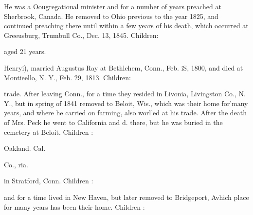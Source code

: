 \documentclass[oneside]{book}
\begin{document}
He was a Oougregatioual minister and for a number of years 
preached at Sherbrook, Canada. He removed to Ohio previous 
to the year 1825, and continued preaching there until within a 
few years of his death, which occurred at Greeusburg, Trumbull 
Co., Dec. 13, 1845. Children: 




aged 21 years. 






Henryi), married Augustus Ray at Bethlehem, Conn., Feb. iS, 
1800, and died at Montieello, N. Y., Feb. 29, 1813. Children: 









trade. After leaving Conn., for a time they resided in Livonia, 
Livingston Co., N. Y., but in spring of 1841 removed to Beloit, 
Wis., which was their home for'many years, and where he 
carried on farming, also worl'ed at his trade. After the 
death of Mrs. Peck he went to California and d. there, but he 
was buried in the cemetery at Beloit. Children : 




Oakland. Cal. 



Co., ria. 



in Stratford, Conn. Children : 





and for a time lived in New Haven, but later removed 
to Bridgeport, Avhich place for many years has been 
their home. Children : 
\end{document}
